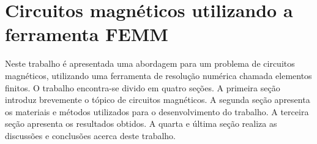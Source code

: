 \chapter{Circuitos magnéticos utilizando a ferramenta FEMM}
\label{chap1}
Neste trabalho é apresentada uma abordagem para um problema de circuitos magnéticos, utilizando uma ferramenta de resolução numérica chamada elementos finitos. O trabalho encontra-se divido em quatro seções. A primeira seção introduz brevemente o tópico de circuitos magnéticos. A segunda seção apresenta os materiais e métodos utilizados para o desenvolvimento do trabalho. A terceira seção apresenta os resultados obtidos. A quarta e última seção realiza as discussões e conclusões acerca deste trabalho.
\newpage
\pagebreak

\newpage
\pagebreak

\newpage
\pagebreak

\newpage
\pagebreak

